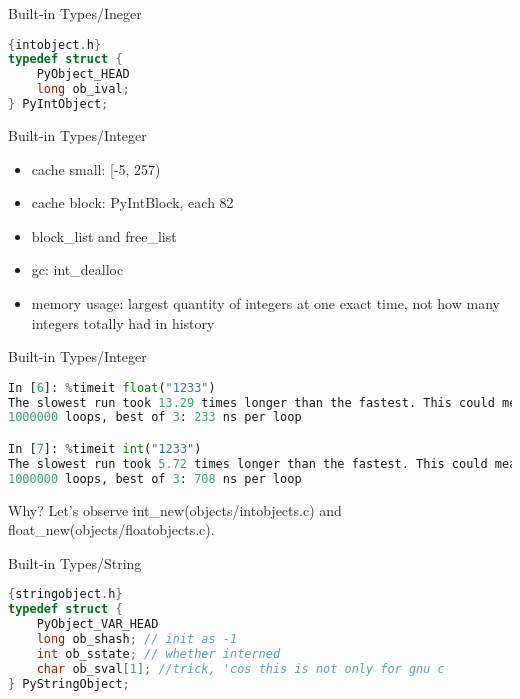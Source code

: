 \documentclass[xcolor=svgnames]{beamer}
\begin{document}
\begin{frame}[fragile]{Built-in Types/Ineger}
\begin{lstlisting}[language=C]{intobject.h}
typedef struct {
    PyObject_HEAD
    long ob_ival;
} PyIntObject;
\end{lstlisting} 
\end{frame}

\begin{frame}{Built-in Types/Integer}
\begin{itemize} 
    \item cache small: [-5, 257)
  \item cache block: PyIntBlock, each 82
  \item block\_list and free\_list
  \item gc: int\_dealloc
  \item memory usage: largest quantity of integers at one exact time, not how many integers totally had in history
\end{itemize}
\end{frame}

\begin{frame}[fragile]{Built-in Types/Integer}
\begin{lstlisting}[language=Python]
In [6]: %timeit float("1233")
The slowest run took 13.29 times longer than the fastest. This could mean that an intermediate result is being cached
1000000 loops, best of 3: 233 ns per loop

In [7]: %timeit int("1233")
The slowest run took 5.72 times longer than the fastest. This could mean that an intermediate result is being cached
1000000 loops, best of 3: 708 ns per loop
\end{lstlisting} 
Why?
Let's observe int\_new(objects/intobjects.c) and float\_new(objects/floatobjects.c).
\end{frame}

\begin{frame}[fragile]{Built-in Types/String}
\begin{lstlisting}[language=C]{stringobject.h}
typedef struct {
    PyObject_VAR_HEAD
    long ob_shash; // init as -1
    int ob_sstate; // whether interned
    char ob_sval[1]; //trick, 'cos this is not only for gnu c
} PyStringObject;
\end{lstlisting} 
\end{frame}
\end{document}
